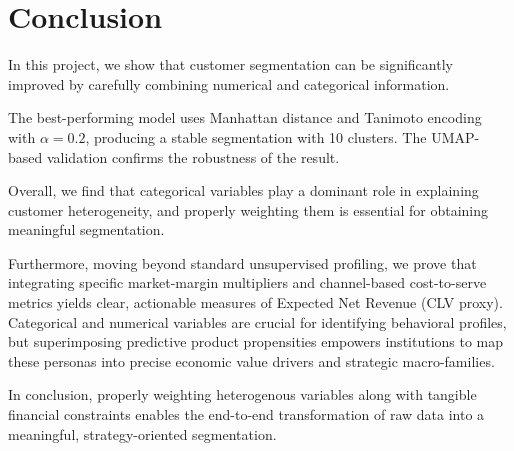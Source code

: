 \documentclass[9pt,a4paper,twocolumn,twoside]{rho-class/rho}
\begin{document}

\section{Conclusion}

In this project, we show that customer segmentation can be significantly improved by carefully combining numerical and categorical information.

The best-performing model uses Manhattan distance and Tanimoto encoding with $\alpha = 0.2$, producing a stable segmentation with 10 clusters. The UMAP-based validation confirms the robustness of the result.

Overall, we find that categorical variables play a dominant role in explaining customer heterogeneity, and properly weighting them is essential for obtaining meaningful segmentation.

Furthermore, moving beyond standard unsupervised profiling, we prove that integrating specific market-margin multipliers and channel-based cost-to-serve metrics yields clear, actionable measures of Expected Net Revenue (CLV proxy). Categorical and numerical variables are crucial for identifying behavioral profiles, but superimposing predictive product propensities empowers institutions to map these personas into precise economic value drivers and strategic macro-families.

In conclusion, properly weighting heterogenous variables along with tangible financial constraints enables the end-to-end transformation of raw data into a meaningful, strategy-oriented segmentation.

\nocite{*}
\printbibliography

\end{document}
